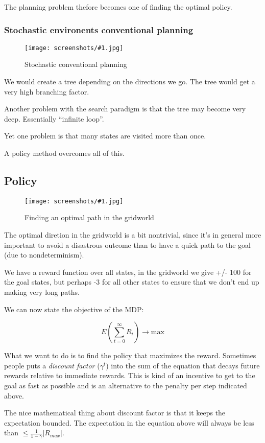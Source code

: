 \documentclass[a4, 12pt, english, USenglish]{scrreprt}
\newcommand{\screenshot}[2]{
\begin{figure}[htb]
\texttt{[image: screenshots/\#1.jpg]}
\label{#1}
\caption{#2}
\end{figure}}
\newcommand{\idx}[1]{{\em #1}\index{#1}}
\begin{document}
The planning problem thefore becomes one of finding the optimal
policy.

\subsubsection{Stochastic environents conventional planning}

\screenshot{stochenvconventionalplanning}{Stochastic conventional planning}

We would create a tree depending on the directions we go.  The tree
would get a very high branching factor.

Another problem with the search paradigm is that the tree may become
very deep.  Essentially ``infinite loop''.  

Yet one problem is that many states are visited more than once.

A policy method overcomes all of this.

\subsection{Policy}

\screenshot {gridworldoptimalpath}{Finding an optimal path in the gridworld} 

The optimal diretion in the gridworld is a bit nontrivial, since it's
in general more important to avoid a disastrous outcome than to have a
quick path to the goal (due to nondeterminism).

We have a reward function over all states, in the gridworld we give
+/-  100 for the goal states, but perhaps -3 for all other states to
ensure that we don't end up making very long paths.

We can now state the objective of the MDP:


\[
   E ( \sum_{t=0}^{\infty} R_t ) \rightarrow \mbox{max}
\]



What we want to do is to find the policy that maximizes the reward.
Sometimes people puts a \idx{discount factor} (\(\gamma^t\)) into the
sum of the equation that decays future rewards relative to immediate
rewards.  This is kind of an incentive to get to the goal as fast as
possible and  is an alternative to the penalty per step indicated
above.

The nice mathematical thing about discount factor is that it keeps the
expectation bounded.   The expectation in the equation above will
always be less than \(\leq \frac{1}{1-\gamma} |R_{max}|\).
\end{document}
